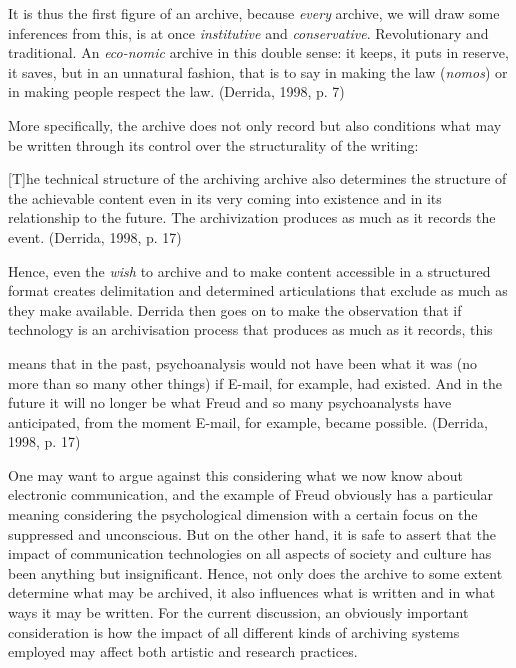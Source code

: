It is thus the first figure of an archive, because \emph{every} archive,
we will draw some inferences from this, is at once \emph{institutive}
and \emph{conservative}. Revolutionary and traditional. An
\emph{eco-nomic} archive in this double sense: it keeps, it puts in
reserve, it saves, but in an unnatural fashion, that is to say in making
the law (\emph{nomos}) or in making people respect the law. (Derrida,
1998, p. 7)

More specifically, the archive does not only record but also conditions
what may be written through its control over the structurality of the
writing:

{[}T{]}he technical structure of the archiving archive also determines
the structure of the achievable content even in its very coming into
existence and in its relationship to the future. The archivization
produces as much as it records the event. (Derrida, 1998, p. 17)

Hence, even the \emph{wish} to archive and to make content accessible in
a structured format creates delimitation and determined articulations
that exclude as much as they make available. Derrida then goes on to
make the observation that if technology is an archivisation process that
produces as much as it records, this

means that in the past, psychoanalysis would not have been what it was
(no more than so many other things) if E-mail, for example, had existed.
And in the future it will no longer be what Freud and so many
psychoanalysts have anticipated, from the moment E-mail, for example,
became possible. (Derrida, 1998, p. 17)

One may want to argue against this considering what we now know about
electronic communication, and the example of Freud obviously has a
particular meaning considering the psychological dimension with a
certain focus on the suppressed and unconscious. But on the other hand,
it is safe to assert that the impact of communication technologies on
all aspects of society and culture has been anything but insignificant.
Hence, not only does the archive to some extent determine what may be
archived, it also influences what is written and in what ways it may be
written. For the current discussion, an obviously important
consideration is how the impact of all different kinds of archiving
systems employed may affect both artistic and research practices.

